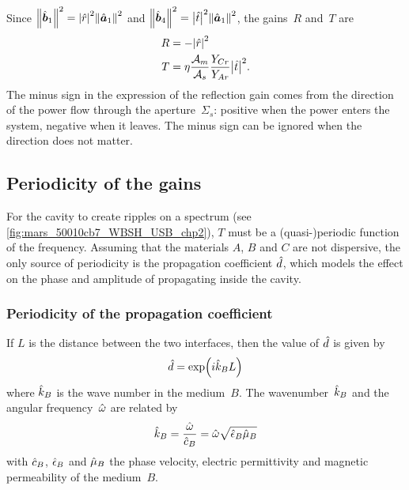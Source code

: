 Since $\norm{\vectcp{b}_1}^2 = \abs{\cp{r}}^2 \norm{\vectcp{a}_1}^2$
and   $\norm{\vectcp{b}_4}^2 = \abs{\cp{t}}^2 \norm{\vectcp{a}_1}^2$,
the gains~$R$ and~$T$ are
\begin{align}
    R
    &=
    -\abs{\cp{r}}^2
    \label{eq:fabry_gain_r}
    \\%
    T
    &=
    \eta
    \frac{\mathcal{A}_m}{\mathcal{A}_s}
    \frac{Y_{Cr}}{Y_{Ar}}
    \abs{\cp{t}}^2
    \text{.}
    \label{eq:fabry_gain_t}
\end{align}
The minus sign in the expression of the reflection gain comes from the direction of the power flow through the aperture~$\Sigma_s$: positive when the power enters the system, negative when it leaves.
The minus sign can be ignored when the direction does not matter.






\subsection{Periodicity of the gains}
\label{sec:periodicity_in_power}

For the cavity to create ripples on a spectrum (see \vref{fig:mars_50010cb7_WBSH_USB_chp2}), $T$ must be a (quasi-)periodic function of the frequency.
Assuming that the materials $A$, $B$ and $C$ are not dispersive, the only source of periodicity is the propagation coefficient $\hat{d}$, which models the effect on the phase and amplitude of propagating inside the cavity.



\subsubsection{Periodicity of the propagation coefficient}

If $L$ is the distance between the two interfaces, then the value of $\hat{d}$ is given by
\begin{equation}
    \cp{d} = \exp \left( i\cp{k}_B L \right) \label{eq:cavity_s_k}
\end{equation}
where $\hat{k}_B$ is the wave number in the medium~$B$.
The wavenumber~$\hat{k}_B$ and the angular frequency~$\hat{\omega}$ are related by
\begin{equation}
    \hat{k}_B
    =
    \frac{\hat{\omega}}{\hat{c}_B}
    =
    \hat{\omega} \sqrt{\hat{\epsilon}_B \hat{\mu}_B}
\end{equation}
with $\hat{c}_B$, $\hat{\epsilon}_B$ and $\hat{\mu}_B$ the phase velocity, electric permittivity and magnetic permeability of the medium~$B$.

